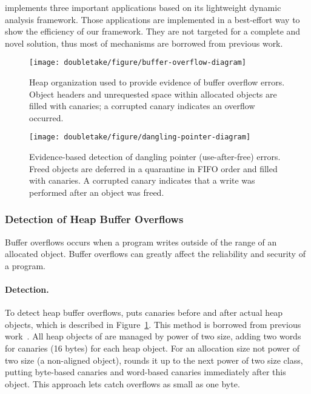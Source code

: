 \doubletake{} implements three important applications based on its lightweight dynamic analysis framework. Those applications are implemented in a best-effort way to show the efficiency of our framework. They are not targeted for a complete and novel solution, thus most of mechanisms are borrowed from previous work. 

\begin{figure}[!t]
\begin{center}
\texttt{[image: doubletake/figure/buffer-overflow-diagram]}
\end{center}
\caption{Heap organization used to provide evidence of buffer overflow errors. Object headers and unrequested space within allocated objects are filled with canaries; a corrupted canary indicates an overflow occurred.
\label{fig:buffer-overflow}}
\end{figure}

\begin{figure}[!t]
\begin{center}
\texttt{[image: doubletake/figure/dangling-pointer-diagram]}
\end{center}
\caption{Evidence-based detection of dangling pointer (use-after-free) errors. Freed objects are deferred in a quarantine in FIFO order and filled with canaries. A corrupted canary indicates that a write was performed after an object was freed.
\label{fig:dangling-pointer}}
\end{figure}


\subsubsection{Detection of Heap Buffer Overflows}
\label{sec:overflow}
Buffer overflows occurs when a program writes outside of the range of an allocated object. Buffer overflows can greatly affect the reliability and security of a program. 

\paragraph{Detection.}
To detect heap buffer overflows, \DoubleTake{} puts canaries before and after actual heap objects, which is described in Figure~\ref{fig:buffer-overflow}. This method is borrowed from previous work~\cite{overflow:lbc, AddressSanitizer}.
All heap objects of \doubletake{} are managed by power of two size, adding two words for canaries (16 bytes) for each heap object. For an allocation size not power of two size (a non-aligned object), \doubletake{} rounds it up to the next power of two size class, putting byte-based canaries and word-based canaries immediately after this object. This approach lets \doubletake{} catch overflows as small as one byte. 

